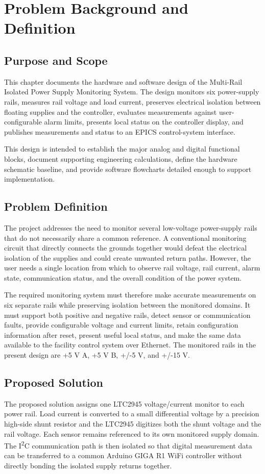 \chapter{Problem Background and Definition}
\label{chap:detailed-design}

\section{Purpose and Scope}
This chapter documents the hardware and software design of the
Multi-Rail Isolated Power Supply Monitoring System. The design monitors six
power-supply rails, measures rail voltage and load current, preserves electrical
isolation between floating supplies and the controller, evaluates measurements
against user-configurable alarm limits, presents local status on the controller
display, and publishes measurements and status to an EPICS control-system
interface.

This design is intended to establish the major analog and digital
functional blocks, document supporting engineering calculations, define the
hardware schematic baseline, and provide software flowcharts detailed enough to
support implementation.

\section{Problem Definition}
The project addresses the need to monitor several low-voltage power-supply rails
that do not necessarily share a common reference. A conventional
monitoring circuit that directly connects the grounds together
would defeat the electrical isolation of the supplies and could create unwanted
return paths. However, the user needs a single location from which to observe rail voltage, rail current, alarm state, communication status, and the overall condition of the power system.

The required monitoring system must therefore make accurate measurements on
six separate rails while preserving isolation between the monitored domains. It
must support both positive and negative rails, detect sensor or communication
faults, provide configurable voltage and current limits, retain configuration
information after reset, present useful local status, and make the same data
available to the facility control system over Ethernet. The monitored rails in
the present design are +5 V A, +5 V B, +/-5 V, and +/-15 V.

\section{Proposed Solution}
The proposed solution assigns one LTC2945 voltage/current monitor to each power
rail. Load current is converted to a small differential voltage by a precision
high-side shunt resistor and the LTC2945 digitizes both the shunt voltage and the
rail voltage. Each sensor remains referenced to its own monitored supply domain.
The I\textsuperscript{2}C communication path is then isolated so that digital
measurement data can be transferred to a common Arduino GIGA R1 WiFi controller
without directly bonding the isolated supply returns together.

